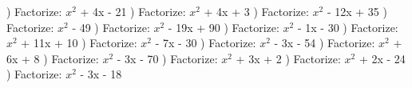 \documentclass{article}%
\begin{document}
\newline%
) Factorize: $x^2$ + 4x - 21%
\newline%
\newline%
) Factorize: $x^2$ + 4x + 3%
\newline%
\newline%
) Factorize: $x^2$ - 12x + 35%
\newline%
\newline%
) Factorize: $x^2$ - 49%
\newline%
\newline%
) Factorize: $x^2$ - 19x + 90%
\newline%
\newline%
) Factorize: $x^2$ - 1x - 30%
\newline%
\newline%
) Factorize: $x^2$ + 11x + 10%
\newline%
\newline%
) Factorize: $x^2$ - 7x - 30%
\newline%
\newline%
) Factorize: $x^2$ - 3x - 54%
\newline%
\newline%
) Factorize: $x^2$ + 6x + 8%
\newline%
\newline%
) Factorize: $x^2$ - 3x - 70%
\newline%
\newline%
) Factorize: $x^2$ + 3x + 2%
\newline%
\newline%
) Factorize: $x^2$ + 2x - 24%
\newline%
\newline%
) Factorize: $x^2$ - 3x - 18%
\newline%
\newline%
\newline%
\end{document}
